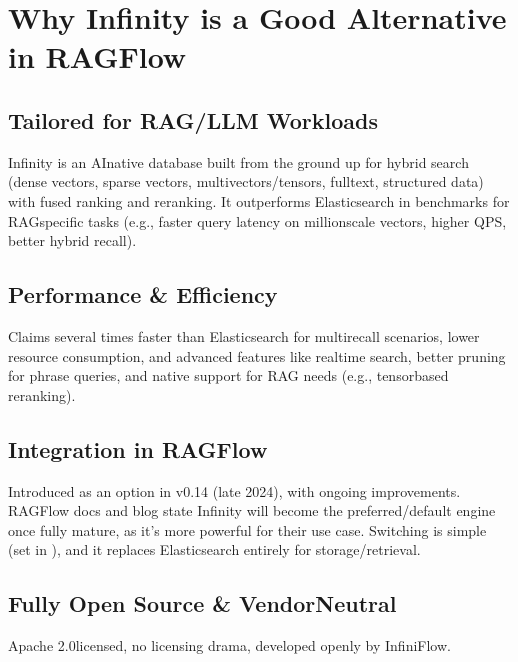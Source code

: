 \documentclass[letterpaper,10pt,english]{sphinxmanual}
\begin{document}
\sphinxstepscope


\chapter{Why Infinity is a Good Alternative in RAGFlow}
\label{\detokenize{infinity:why-infinity-is-a-good-alternative-in-ragflow}}\label{\detokenize{infinity::doc}}

\section{Tailored for RAG/LLM Workloads}
\label{\detokenize{infinity:tailored-for-rag-llm-workloads}}
\sphinxAtStartPar
Infinity is an AI\sphinxhyphen{}native database built from the ground up for hybrid search (dense vectors, sparse vectors, multi\sphinxhyphen{}vectors/tensors, full\sphinxhyphen{}text, structured data) with fused ranking and reranking. It outperforms Elasticsearch in benchmarks for RAG\sphinxhyphen{}specific tasks (e.g., faster query latency  on million\sphinxhyphen{}scale vectors, higher QPS, better hybrid recall).


\section{Performance \& Efficiency}
\label{\detokenize{infinity:performance-efficiency}}
\sphinxAtStartPar
Claims several times faster than Elasticsearch for multi\sphinxhyphen{}recall scenarios, lower resource consumption, and advanced features like real\sphinxhyphen{}time search, better pruning for phrase queries, and native support for RAG needs (e.g., tensor\sphinxhyphen{}based reranking).


\section{Integration in RAGFlow}
\label{\detokenize{infinity:integration-in-ragflow}}
\sphinxAtStartPar
Introduced as an option in v0.14 (late 2024), with ongoing improvements. RAGFlow docs and blog state Infinity will become the preferred/default engine once fully mature, as it’s more powerful for their use case. Switching is simple (set  in ), and it replaces Elasticsearch entirely for storage/retrieval.


\section{Fully Open Source \& Vendor\sphinxhyphen{}Neutral}
\label{\detokenize{infinity:fully-open-source-vendor-neutral}}
\sphinxAtStartPar
Apache 2.0\sphinxhyphen{}licensed, no licensing drama, developed openly by InfiniFlow.
\end{document}
